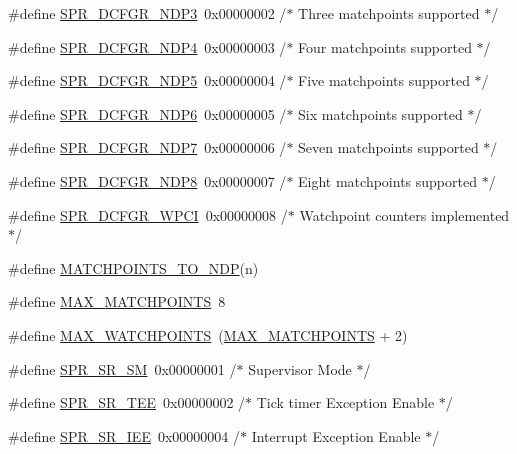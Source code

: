 \begin{DoxyCompactItemize}
\item 
\#define \hyperlink{spr-defs_8h_aad8738df426a2cd1ac14ed55a3eb4a07}{\-S\-P\-R\-\_\-\-D\-C\-F\-G\-R\-\_\-\-N\-D\-P3}~0x00000002  /$\ast$ Three matchpoints supported $\ast$/
\item 
\#define \hyperlink{spr-defs_8h_a4c93d75d0259ed08f6dc8afafc54c56a}{\-S\-P\-R\-\_\-\-D\-C\-F\-G\-R\-\_\-\-N\-D\-P4}~0x00000003  /$\ast$ Four matchpoints supported $\ast$/
\item 
\#define \hyperlink{spr-defs_8h_ad778759783b65f6c4e09d6d9224055f5}{\-S\-P\-R\-\_\-\-D\-C\-F\-G\-R\-\_\-\-N\-D\-P5}~0x00000004  /$\ast$ Five matchpoints supported $\ast$/
\item 
\#define \hyperlink{spr-defs_8h_a21765ce968cef846bcb21096cf2246e9}{\-S\-P\-R\-\_\-\-D\-C\-F\-G\-R\-\_\-\-N\-D\-P6}~0x00000005  /$\ast$ Six matchpoints supported $\ast$/
\item 
\#define \hyperlink{spr-defs_8h_a5ff1a807dc2de262f05092221100efae}{\-S\-P\-R\-\_\-\-D\-C\-F\-G\-R\-\_\-\-N\-D\-P7}~0x00000006  /$\ast$ Seven matchpoints supported $\ast$/
\item 
\#define \hyperlink{spr-defs_8h_a39b603864cd3589f6df4cd5ae87e9a3e}{\-S\-P\-R\-\_\-\-D\-C\-F\-G\-R\-\_\-\-N\-D\-P8}~0x00000007  /$\ast$ Eight matchpoints supported $\ast$/
\item 
\#define \hyperlink{spr-defs_8h_abcbdd6d3973efaa68e599d2a9c41af93}{\-S\-P\-R\-\_\-\-D\-C\-F\-G\-R\-\_\-\-W\-P\-C\-I}~0x00000008  /$\ast$ Watchpoint counters implemented $\ast$/
\item 
\#define \hyperlink{spr-defs_8h_ad591848bf351d98f47fcac77cde306f4}{\-M\-A\-T\-C\-H\-P\-O\-I\-N\-T\-S\-\_\-\-T\-O\-\_\-\-N\-D\-P}(n)
\item 
\#define \hyperlink{spr-defs_8h_ad73e5a54a3ef51ce3fc8c029cae04b7b}{\-M\-A\-X\-\_\-\-M\-A\-T\-C\-H\-P\-O\-I\-N\-T\-S}~8
\item 
\#define \hyperlink{spr-defs_8h_af94d337a666ee76d67fca30b918cb42d}{\-M\-A\-X\-\_\-\-W\-A\-T\-C\-H\-P\-O\-I\-N\-T\-S}~(\hyperlink{spr-defs_8h_ad73e5a54a3ef51ce3fc8c029cae04b7b}{\-M\-A\-X\-\_\-\-M\-A\-T\-C\-H\-P\-O\-I\-N\-T\-S} + 2)
\item 
\#define \hyperlink{spr-defs_8h_a971b66b10515c0625c24c14eb9d8260c}{\-S\-P\-R\-\_\-\-S\-R\-\_\-\-S\-M}~0x00000001  /$\ast$ Supervisor Mode $\ast$/
\item 
\#define \hyperlink{spr-defs_8h_a30dc39b3c75d5b764046a29c1b9ef376}{\-S\-P\-R\-\_\-\-S\-R\-\_\-\-T\-E\-E}~0x00000002  /$\ast$ Tick timer Exception Enable $\ast$/
\item 
\#define \hyperlink{spr-defs_8h_a9a5f711e7e1346e1516179b4737fd54d}{\-S\-P\-R\-\_\-\-S\-R\-\_\-\-I\-E\-E}~0x00000004  /$\ast$ Interrupt Exception Enable $\ast$/

\end{DoxyCompactItemize}
